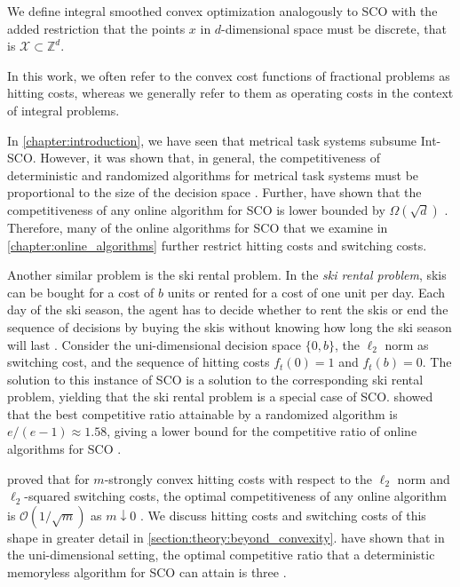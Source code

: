 \begin{problem}
We define integral smoothed convex optimization analogously to SCO with the added restriction that the points $x$ in $d$-dimensional space must be discrete, that is $\mathcal{X} \subset \mathbb{Z}^d$.
\end{problem}

In this work, we often refer to the convex cost functions of fractional problems as hitting costs, whereas we generally refer to them as operating costs in the context of integral problems.

In \autoref{chapter:introduction}, we have seen that metrical task systems subsume Int-SCO. However, it was shown that, in general, the competitiveness of deterministic and randomized algorithms for metrical task systems must be proportional to the size of the decision space \cite{Blum1992, Borodin1992}. Further, \citeauthor*{Chen2018} have shown that the competitiveness of any online algorithm for SCO is lower bounded by $\Omega(\sqrt{d})$ \cite{Chen2018}. Therefore, many of the online algorithms for SCO that we examine in \autoref{chapter:online_algorithms} further restrict hitting costs and switching costs.

Another similar problem is the ski rental problem. In the \emph{ski rental problem}, skis can be bought for a cost of $b$ units or rented for a cost of one unit per day. Each day of the ski season, the agent has to decide whether to rent the skis or end the sequence of decisions by buying the skis without knowing how long the ski season will last \cite{Shah2021}. Consider the uni-dimensional decision space $\{0,b\}$, the $\ell_2$ norm as switching cost, and the sequence of hitting costs $f_t(0) = 1$ and $f_t(b) = 0$. The solution to this instance of SCO is a solution to the corresponding ski rental problem, yielding that the ski rental problem is a special case of SCO. \citeauthor*{Karlin1990} showed that the best competitive ratio attainable by a randomized algorithm is $e/(e-1) \approx 1.58$, giving a lower bound for the competitive ratio of online algorithms for SCO \cite{Karlin1990}.

\citeauthor*{Goel2019} proved that for $m$-strongly convex hitting costs with respect to the $\ell_2$ norm and $\ell_2$-squared switching costs, the optimal competitiveness of any online algorithm is $\mathcal{O}(1/\sqrt{m})$ as $m \downarrow 0$ \cite{Goel2019}. We discuss hitting costs and switching costs of this shape in greater detail in \autoref{section:theory:beyond_convexity}. \citeauthor*{Bansal2015} have shown that in the uni-dimensional setting, the optimal competitive ratio that a deterministic memoryless algorithm for SCO can attain is three \cite{Bansal2015}.

